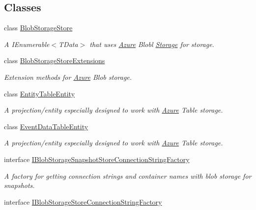 \subsection*{Classes}
\begin{DoxyCompactItemize}
\item 
class \hyperlink{classCqrs_1_1Azure_1_1BlobStorage_1_1BlobStorageStore}{Blob\+Storage\+Store}
\begin{DoxyCompactList}\small\item\em A I\+Enumerable$<$\+T\+Data$>$ that uses \hyperlink{namespaceCqrs_1_1Azure}{Azure} Blobl \hyperlink{namespaceCqrs_1_1Azure_1_1Storage}{Storage} for storage. \end{DoxyCompactList}\item 
class \hyperlink{classCqrs_1_1Azure_1_1BlobStorage_1_1BlobStorageStoreExtensions}{Blob\+Storage\+Store\+Extensions}
\begin{DoxyCompactList}\small\item\em Extension methods for \hyperlink{namespaceCqrs_1_1Azure}{Azure} Blob storage. \end{DoxyCompactList}\item 
class \hyperlink{classCqrs_1_1Azure_1_1BlobStorage_1_1EntityTableEntity}{Entity\+Table\+Entity}
\begin{DoxyCompactList}\small\item\em A projection/entity especially designed to work with \hyperlink{namespaceCqrs_1_1Azure}{Azure} Table storage. \end{DoxyCompactList}\item 
class \hyperlink{classCqrs_1_1Azure_1_1BlobStorage_1_1EventDataTableEntity}{Event\+Data\+Table\+Entity}
\begin{DoxyCompactList}\small\item\em A projection/entity especially designed to work with \hyperlink{namespaceCqrs_1_1Azure}{Azure} Table storage. \end{DoxyCompactList}\item 
interface \hyperlink{interfaceCqrs_1_1Azure_1_1BlobStorage_1_1IBlobStorageSnapshotStoreConnectionStringFactory}{I\+Blob\+Storage\+Snapshot\+Store\+Connection\+String\+Factory}
\begin{DoxyCompactList}\small\item\em A factory for getting connection strings and container names with blob storage for snapshots. \end{DoxyCompactList}\item 
interface \hyperlink{interfaceCqrs_1_1Azure_1_1BlobStorage_1_1IBlobStorageStoreConnectionStringFactory}{I\+Blob\+Storage\+Store\+Connection\+String\+Factory}

\end{DoxyCompactItemize}
